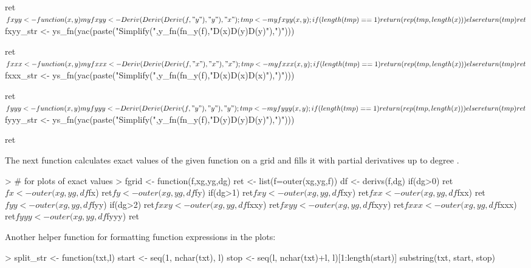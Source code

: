 \documentclass[nojss]{jss}
\begin{document}
\begin{Schunk}
\begin{Sinput}
{{{{                 ret$fxyy <- function(x,y){
                     myfxyy <- Deriv(Deriv(Deriv(f,"y"),"y"),"x");
                     tmp <- myfxyy(x,y);
                     if(length(tmp)==1)
                         return(rep(tmp,length(x)))
                     else
                         return(tmp)
                 }
                 ret$fxyy_str  <- ys_fn(yac(paste("Simplify(",y_fn(fn_y(f),"D(x)D(y)D(y)"),")")))
 
                 ret$fxxx <- function(x,y){
                     myfxxx <- Deriv(Deriv(Deriv(f,"x"),"x"),"x");
                     tmp <- myfxxx(x,y);
                     if(length(tmp)==1)
                         return(rep(tmp,length(x)))
                     else
                         return(tmp)
                 }
                 ret$fxxx_str  <- ys_fn(yac(paste("Simplify(",y_fn(fn_y(f),"D(x)D(x)D(x)"),")")))
 
                 ret$fyyy <- function(x,y){
                     myfyyy <- Deriv(Deriv(Deriv(f,"y"),"y"),"y");
                     tmp <- myfyyy(x,y);
                     if(length(tmp)==1)
                         return(rep(tmp,length(x)))
                     else
                         return(tmp)
                 }
                 ret$fyyy_str  <- ys_fn(yac(paste("Simplify(",y_fn(fn_y(f),"D(y)D(y)D(y)"),")")))
             }
         }
     }
     ret
 }
\end{Sinput}
\end{Schunk}

The next function calculates exact values of the given function on a
grid and fills it with partial derivatives up to degree .

\begin{Schunk}
\begin{Sinput}
> # for plots of exact values
> fgrid <- function(f,xg,yg,dg){
   ret <- list(f=outer(xg,yg,f))
   df <- derivs(f,dg)
   if(dg>0){
     ret$fx  <- outer(xg,yg,df$fx)
     ret$fy  <- outer(xg,yg,df$fy)
     if(dg>1){
       ret$fxy <- outer(xg,yg,df$fxy)
       ret$fxx <- outer(xg,yg,df$fxx)
       ret$fyy <- outer(xg,yg,df$fyy)
       if(dg>2){
         ret$fxxy <- outer(xg,yg,df$fxxy)
         ret$fxyy <- outer(xg,yg,df$fxyy)
         ret$fxxx <- outer(xg,yg,df$fxxx)
         ret$fyyy <- outer(xg,yg,df$fyyy)
       }
     }
   }
   ret
 }
\end{Sinput}
\end{Schunk}

Another helper function for formatting function expressions in the plots:
\begin{Schunk}
\begin{Sinput}
> split_str <- function(txt,l){
   start <- seq(1, nchar(txt), l)
   stop <- seq(l, nchar(txt)+l, l)[1:length(start)]
   substring(txt, start, stop)
 }
\end{Sinput}
\end{Schunk}
\end{document}
